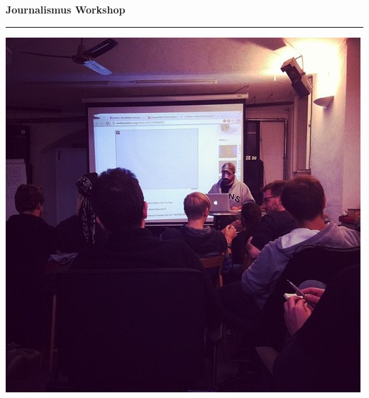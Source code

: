 \documentclass{seminar}
\providecommand{\T}[1]{
	\begin{center}
		{\bf #1}
	\end{center}
	\vspace{2mm}
	\hrule
	\vspace{2mm}
}
\begin{document}
\begin{slide}
	\T{Journalismus Workshop}
	\begin{center}
		\includegraphics[scale=0.35]{journalism_workshop.jpeg}
	\end{center}
\end{slide}
\end{document}
